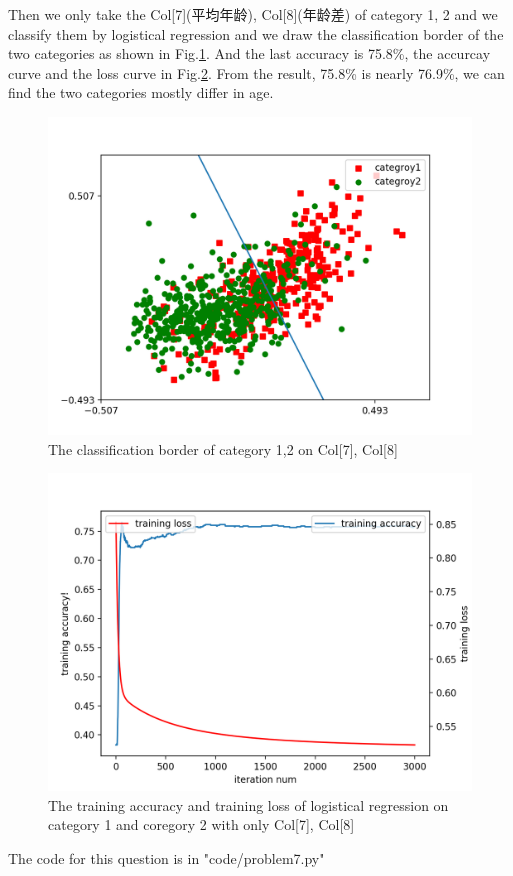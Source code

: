 \documentclass[a4paper]{article}
\begin{document}
Then we only take the Col[7](平均年龄), Col[8](年龄差) of category 1, 2 and we classify them by logistical regression and we draw the classification border of the two categories as shown in Fig.\ref{73}. And the last accuracy is 75.8\%, the accurcay curve and the loss curve in Fig.\ref{72}. From the result, 75.8\% is nearly 76.9\%, we can find the two categories mostly differ in age.

\begin{figure}[h]
	\centering
	\includegraphics[width=0.8\linewidth]{images/73.png}
	\caption{\label{73}The classification border of category 1,2 on Col[7], Col[8]}
\end{figure}

\begin{figure}[h]
	\centering
	\includegraphics[width=0.8\linewidth]{images/72.png}
	\caption{\label{72}The training accuracy and training loss of logistical regression on category 1 and coregory 2 with only Col[7], Col[8]}
\end{figure}

The code for this question is in "code/problem7.py"
\end{document}
